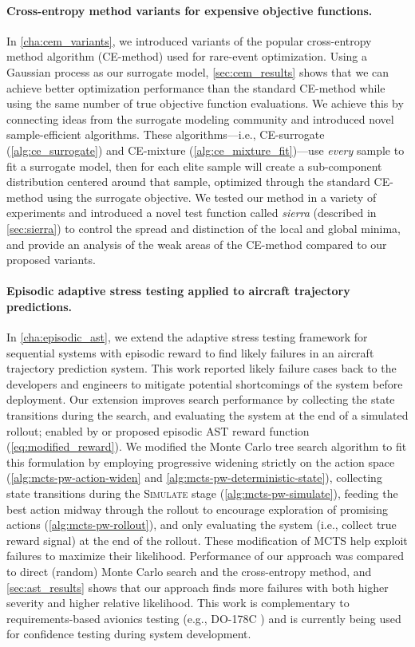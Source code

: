 \paragraph{Cross-entropy method variants for expensive objective functions.}
In \cref{cha:cem_variants}, we introduced variants of the popular cross-entropy method algorithm (CE-method) used for rare-event optimization.
Using a Gaussian process as our surrogate model, \cref{sec:cem_results} shows that we can achieve better optimization performance than the standard CE-method while using the same number of true objective function evaluations.
We achieve this by connecting ideas from the surrogate modeling community and introduced novel sample-efficient algorithms.
These algorithms---i.e., CE-surrogate (\cref{alg:ce_surrogate}) and CE-mixture (\cref{alg:ce_mixture_fit})---use \textit{every} sample to fit a surrogate model, then for each elite sample will create a sub-component distribution centered around that sample, optimized through the standard CE-method using the surrogate objective.
We tested our method in a variety of experiments and introduced a novel test function called \textit{sierra} (described in \cref{sec:sierra}) to control the spread and distinction of the local and global minima, and provide an analysis of the weak areas of the CE-method compared to our proposed variants.


\paragraph{Episodic adaptive stress testing applied to aircraft trajectory predictions.} In \cref{cha:episodic_ast}, we extend the adaptive stress testing framework for sequential systems with episodic reward to find likely failures in an aircraft trajectory prediction system.
This work reported likely failure cases back to the developers and engineers to mitigate potential shortcomings of the system before deployment.
Our extension improves search performance by collecting the state transitions during the search, and evaluating the system at the end of a simulated rollout; enabled by or proposed episodic AST reward function (\cref{eq:modified_reward}).
We modified the Monte Carlo tree search algorithm to fit this formulation by employing progressive widening strictly on the action space (\cref{alg:mcts-pw-action-widen} and \cref{alg:mcts-pw-deterministic-state}), collecting state transitions during the \textsc{Simulate} stage (\cref{alg:mcts-pw-simulate}), feeding the best action midway through the rollout to encourage exploration of promising actions (\cref{alg:mcts-pw-rollout}), and only evaluating the system (i.e., collect true reward signal) at the end of the rollout.
These modification of MCTS help exploit failures to maximize their likelihood.
Performance of our approach was compared to direct (random) Monte Carlo search and the cross-entropy method, and \cref{sec:ast_results} shows that our approach finds more failures with both higher severity and higher relative likelihood.
This work is complementary to requirements-based avionics testing (e.g., DO-178C \cite{do178c}) and is currently being used for confidence testing during system development.


